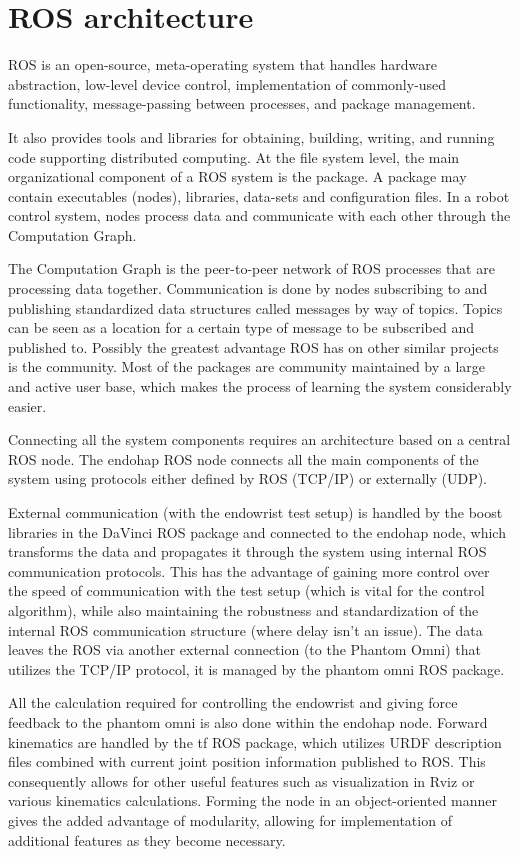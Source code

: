 \section{ROS architecture}\label{ros_architec}
ROS is an open-source, meta-operating system that handles
hardware abstraction, low-level device control, implementation
of commonly-used functionality, message-passing between
processes, and package management.

 It also provides tools and libraries for obtaining, building, writing, and running code supporting distributed computing. At the file system level, the main organizational component of a ROS system
is the package. A package may contain executables (nodes),
libraries, data-sets and configuration files. In a robot control
system, nodes process data and communicate with each other
through the Computation Graph.

The Computation Graph is the peer-to-peer network of ROS
processes that are processing data together. Communication
is done by nodes subscribing to and publishing standardized
data structures called messages by way of topics. Topics can
be seen as a location for a certain type of message to be
subscribed and published to. Possibly the greatest advantage
ROS has on other similar projects is the community. Most of
the packages are community maintained by a large and active
user base, which makes the process of learning the system
considerably easier.

Connecting all the system components requires an architecture based on a central ROS node.
The endohap ROS node connects all the main components of the system using protocols either defined by ROS (TCP/IP) or externally (UDP).

External communication (with the endowrist test setup) is handled by the boost libraries in the DaVinci ROS package and connected to the endohap node, which transforms the data and propagates it through the system using internal ROS communication protocols. 
This has the advantage of gaining more control over the speed of communication with the test setup (which is vital for the control algorithm), while also maintaining the robustness and standardization of the internal ROS communication structure (where delay isn't an issue). The data leaves the ROS via another external connection (to the Phantom Omni) that utilizes the TCP/IP protocol, it is managed by the phantom omni ROS package.

All the calculation required for controlling the endowrist and giving force feedback to the phantom omni is also done within the endohap node. Forward kinematics are handled by the tf ROS package, which utilizes URDF description files combined with current joint position information published to ROS.
This consequently allows for other useful features such as visualization in Rviz or various kinematics calculations.
Forming the node in an object-oriented manner gives the added advantage of modularity, allowing for implementation of additional features as they become necessary. 


